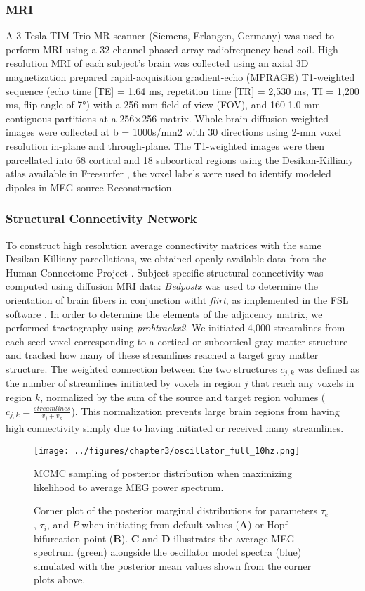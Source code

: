 \subsubsection{MRI}
A 3 Tesla TIM Trio MR scanner (Siemens, Erlangen, Germany) was used to perform MRI using a 32-channel phased-array radiofrequency head coil. High-resolution MRI of each subject's brain was collected using an axial 3D magnetization prepared rapid-acquisition gradient-echo (MPRAGE) T1-weighted sequence (echo time [TE] = 1.64 ms, repetition time [TR] = 2,530 ms, TI = 1,200 ms, flip angle of 7°) with a 256-mm field of view (FOV), and 160 1.0-mm contiguous partitions at a 256×256 matrix. Whole-brain diffusion weighted images were collected at b = 1000s/mm2 with 30 directions using 2-mm voxel resolution in-plane and through-plane. The T1-weighted images were then parcellated into 68 cortical and 18 subcortical regions using the Desikan-Killiany atlas available in Freesurfer \cite{Fischl2012, Desikan2006}, the voxel labels were used to identify modeled dipoles in MEG source Reconstruction.

\subsubsection{Structural Connectivity Network}
To construct high resolution average connectivity matrices with the same Desikan-Killiany parcellations, we obtained openly available data from the Human Connectome Project \cite{McNab2013}. Subject specific structural connectivity was computed using diffusion MRI data: \emph{Bedpostx} was used to determine the orientation of brain fibers in conjunction witht \emph{flirt}, as implemented in the FSL software \cite{jenkinson_fsl_2012}. In order to determine the elements of the adjacency matrix, we performed tractography using \emph{probtrackx2}. We initiated 4,000 streamlines from each seed voxel corresponding to a cortical or subcortical gray matter structure and tracked how many of these streamlines reached a target gray matter structure. The weighted connection between the two structures $c_{j,k}$ was defined as the number of streamlines initiated by voxels in region $j$ that reach any voxels in region $k$, normalized by the sum of the source and target region volumes ($c_{j,k} = \frac{streamlines}{v_j + v_k}$). This normalization prevents large brain regions from having high connectivity simply due to having initiated or received many streamlines.

\begin{figure}[ht]
    \centering
    \texttt{[image: ../figures/chapter3/oscillator\_full\_10hz.png]}
    \caption{MCMC sampling of posterior distribution when maximizing likelihood to average MEG power spectrum.}
    \caption*{Corner plot of the posterior marginal distributions for parameters $\tau_e$, $\tau_i$, and $P$ when initiating from default values (\textbf{A}) or Hopf bifurcation point (\textbf{B}). \textbf{C} and \textbf{D} illustrates the average MEG spectrum (green) alongside the oscillator model spectra (blue) simulated with the posterior mean values shown from the corner plots above.}
    \label{fig:oscillator_full}
\end{figure}

